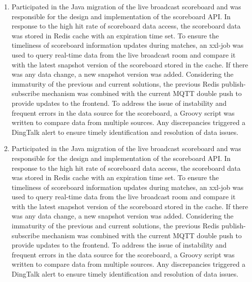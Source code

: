 \documentclass{resume}
\newcommand{\en}[1]{#1}
\newcommand{\zh}[1]{}
\begin{document}
\begin{itemize}
\begin{enumerate}
                      \zh{采用SpringBoot和Vue实现前后端分离，解决跨域和参数传递问题，提高了开发效率和系统的可维护性。}
                \item \en{Participated in the Java migration of the live broadcast scoreboard and was responsible for the design and implementation of the scoreboard API. In response to the high hit rate of scoreboard data access, the scoreboard data was stored in Redis cache with an expiration time set. To ensure the timeliness of scoreboard information updates during matches, an xxl-job was used to query real-time data from the live broadcast room and compare it with the latest snapshot version of the scoreboard stored in the cache. If there was any data change, a new snapshot version was added. Considering the immaturity of the previous and current solutions, the previous Redis publish-subscribe mechanism was combined with the current MQTT double push to provide updates to the frontend. To address the issue of instability and frequent errors in the data source for the scoreboard, a Groovy script was written to compare data from multiple sources. Any discrepancies triggered a DingTalk alert to ensure timely identification and resolution of data issues.}
                      \zh{开发了基于JsonObject的树节点构建和前端渲染功能，使用Tree控件优化用户界面，实现了高效的json数据定位与编辑。}
                \item \en{Participated in the Java migration of the live broadcast scoreboard and was responsible for the design and implementation of the scoreboard API. In response to the high hit rate of scoreboard data access, the scoreboard data was stored in Redis cache with an expiration time set. To ensure the timeliness of scoreboard information updates during matches, an xxl-job was used to query real-time data from the live broadcast room and compare it with the latest snapshot version of the scoreboard stored in the cache. If there was any data change, a new snapshot version was added. Considering the immaturity of the previous and current solutions, the previous Redis publish-subscribe mechanism was combined with the current MQTT double push to provide updates to the frontend. To address the issue of instability and frequent errors in the data source for the scoreboard, a Groovy script was written to compare data from multiple sources. Any discrepancies triggered a DingTalk alert to ensure timely identification and resolution of data issues.}
                      \zh{实现了基于项目配置的json字段过滤和多字段映射功能，增强了数据处理的灵活性和准确性。}
           \end{enumerate}
\end{itemize}
\end{document}
